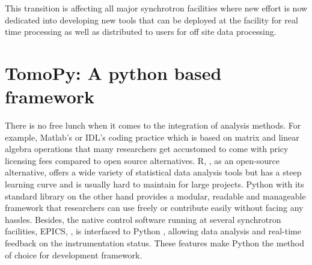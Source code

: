 \documentclass[pdf]{iucr}              %
\begin{document}
This transition is affecting all major synchrotron facilities where new effort is now dedicated into developing new tools that can be deployed at the facility for real time processing as well as distributed to users for off site data processing.


\section{TomoPy: A python based framework}

There is no free lunch when it comes to the integration of analysis methods. For example, Matlab's or IDL's coding practice which is based on matrix and linear algebra operations that many researchers get accustomed to come with pricy licensing fees compared to open source alternatives. R, \cite{r}, as an open-source alternative, offers a wide variety of statistical data analysis tools but has a steep learning curve and is usually hard to maintain for large projects. Python with its standard library on the other hand provides a modular, readable and manageable framework that researchers can use freely or contribute easily without facing any hassles. Besides, the native  control software running at several synchrotron facilities, EPICS, \cite{epics}, is interfaced to Python \cite{pyepics}, allowing data analysis and real-time feedback on the instrumentation status. These features make Python the method of choice for development framework.
\end{document}
